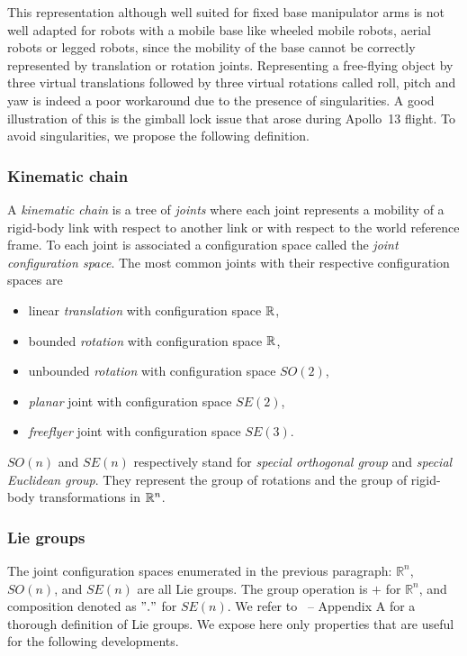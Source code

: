 This representation although well suited for fixed base manipulator
arms is not well adapted for robots with a mobile base like wheeled
mobile robots, aerial robots or legged robots, since the mobility of the base
cannot be correctly represented by translation or rotation joints.
Representing a free-flying object by three virtual translations followed by
three virtual rotations called roll, pitch and yaw is indeed a poor workaround
due to the presence of singularities. A good illustration of this is the gimball
lock issue that arose during Apollo~13 flight. To avoid singularities, we
propose the following definition.

\subsubsection{Kinematic chain}

A \textit{kinematic chain} is a tree of \textit{joints} where each
joint represents a mobility of a rigid-body link with respect to
another link or with respect to the world reference frame. To each joint is
associated a configuration space called the \textit{joint configuration space}.
The most common joints with their respective configuration spaces are
\begin{itemize}
\item linear \textit{translation} with configuration space $\mathbb{R}$,
\item bounded \textit{rotation} with configuration space  $\mathbb{R}$,
\item unbounded \textit{rotation} with configuration space  $SO(2)$,
\item \textit{planar} joint with configuration space $SE(2)$,
\item \textit{freeflyer} joint with configuration space $SE(3)$.
\end{itemize}
$SO(n)$ and $SE(n)$ respectively stand for \textit{special orthogonal group} and \textit{special Euclidean group}. They represent the group of rotations and the group of rigid-body transformations in $\mathbb{R}^n$.

\subsubsection{Lie groups}

The joint configuration spaces enumerated in the previous paragraph: $\mathbb{R}^n$, $SO(n)$, and $SE(n)$ are all Lie groups. The group operation is $+$ for $\mathbb{R}^n$, and composition denoted as $"."$ for $SE(n)$. We refer to~\cite{LMS94} -- Appendix A for a thorough definition of Lie groups. We expose here only properties that are useful for the following developments.

